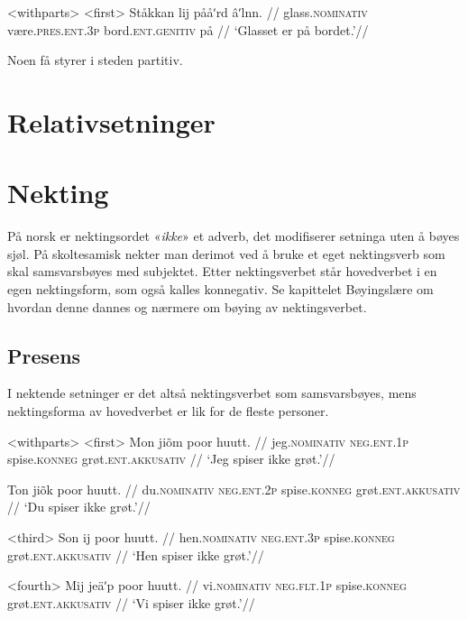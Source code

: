 \pex<withparts> 
\a<first> 
\begingl %
\gla Ståkkan lij pååʹrd âʹlnn. //
\glb glass.\textsc{nominativ} være.\textsc{pres.ent.3p} bord.\textsc{ent.genitiv} på //
\glft `Glasset er på bordet.'//
\endgl

\xe

Noen få styrer i steden partitiv.

\section{Relativsetninger}

\section{Nekting}

På norsk er nektingsordet «\textit{ikke}» et adverb, det modifiserer setninga uten å bøyes sjøl. På skoltesamisk nekter man derimot ved å bruke et eget nektingsverb som skal samsvarsbøyes med subjektet. Etter nektingsverbet står hovedverbet i en egen nektingsform, som også kalles konnegativ. Se kapittelet Bøyingslære om hvordan denne dannes og nærmere om bøying av nektingsverbet.

\subsection{Presens}

I nektende setninger er det altså nektingsverbet som samsvarsbøyes, mens nektingsforma av hovedverbet er lik for de fleste personer.

\pex<withparts> %
\a<first> %
\begingl %
\gla Mon jiõm poor huutt. //
\glb jeg.\textsc{nominativ} \textsc{neg.ent.1p} spise.\textsc{konneg} grøt.\textsc{ent.akkusativ} //
\glft `Jeg spiser ikke grøt.'//
\endgl

\begingl %
\gla Ton jiõk poor huutt. //
\glb du.\textsc{nominativ} \textsc{neg.ent.2p} spise.\textsc{konneg} grøt.\textsc{ent.akkusativ} //
\glft `Du spiser ikke grøt.'//
\endgl

\a<third>
\begingl %
\gla Son ij poor huutt. //
\glb hen.\textsc{nominativ} \textsc{neg.ent.3p} spise.\textsc{konneg} grøt.\textsc{ent.akkusativ} //
\glft `Hen spiser ikke grøt.'//
\endgl

\a<fourth>
\begingl %
\gla Mij jeäʹp poor huutt. //
\glb vi.\textsc{nominativ} \textsc{neg.flt.1p} spise.\textsc{konneg} grøt.\textsc{ent.akkusativ} //
\glft `Vi spiser ikke grøt.'//
\endgl

